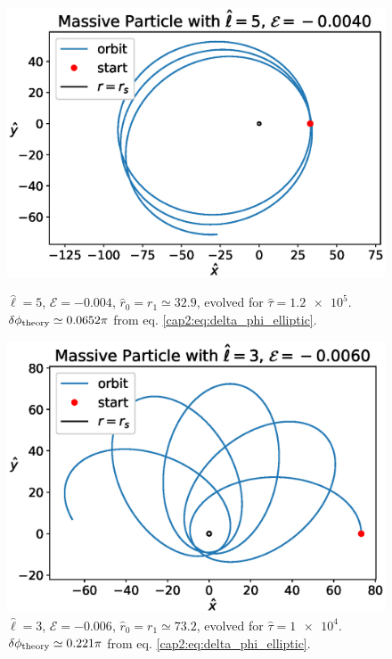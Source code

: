 \begin{figure}[h]
    \begin{minipage}{0.48 \textwidth}
        \centering
        \includegraphics[width=\textwidth]{Figures/chapter2/prec1.eps}
        \caption{$\hat \ell = 5$, $\mathcal E = -0.004$,
        $\hat r_0 = r_1 \simeq 32.9$, evolved for $\hat \tau = \num{1.2e5}$. \\
        $\delta \phi_{\rm theory} \simeq 0.0652 \pi$ from eq.
        \ref{cap2:eq:delta_phi_elliptic}.}
        \label{cap2:fig:prec1}
    \end{minipage}
    \hspace{0.015 \textwidth}
    \begin{minipage}{0.48 \textwidth}
        \centering
        \includegraphics[width=\textwidth]{Figures/chapter2/prec2.eps}
        \caption{$\hat \ell = 3$, $\mathcal E = -0.006$,
        $\hat r_0 = r_1 \simeq 73.2$, evolved for $\hat \tau = \num{1e4}$. \\
        $\delta \phi_{\rm theory} \simeq 0.221 \pi$ from eq.
        \ref{cap2:eq:delta_phi_elliptic}.}
        \label{cap2:fig:prec2}
    \end{minipage}
\end{figure}

